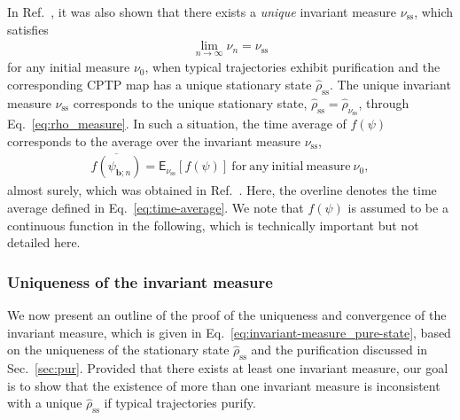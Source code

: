 \documentclass[preprint,pteplogo]{ptephy_v2}%
\numberwithin{equation}{section}
\theoremstyle{definition}
\begin{document}
In Ref.~\cite{benoist2019invariant}, it was also shown that there exists a \textit{unique} invariant measure $\nu_\mathrm{ss}$, which satisfies
\begin{align}
    \lim_{n\rightarrow\infty}\nu_n=\nu_\mathrm{ss}
    \label{eq:invariant-measure_pure-state}
\end{align}
for any initial measure $\nu_0$, when typical trajectories exhibit purification and the corresponding CPTP map has a unique stationary state $\hat{\rho}_\mathrm{ss}$. 
The unique invariant measure $\nu_\mathrm{ss}$ corresponds to the unique stationary state, $\hat{\rho}_\mathrm{ss}=\hat{\rho}_{\nu_\mathrm{ss}}$, through Eq.~\eqref{eq:rho_measure}.
In such a situation, the time average of $f(\psi)$ corresponds to the average over the invariant measure $\nu_\mathrm{ss}$,
\begin{align}
    \overline{f(\psi_{\bm{b};n})}=\mathsf{E}_{\nu_\mathrm{ss}}[f(\psi)]\ \mathrm{for\ any\ initial\ measure}\ \nu_0,
    \label{eq:average_nonlinear-quantity_any-measure}
\end{align}
almost surely, which was obtained in Ref.~\cite{benoist2023limit}. 
Here, the overline denotes the time average defined in Eq.~\eqref{eq:time-average}.
We note that $f(\psi)$ is assumed to be a continuous function in the following, which is technically important but not detailed here.  


\subsubsection{Uniqueness of the invariant measure}
We now present an outline of the proof of the uniqueness and convergence of the invariant measure, which is given in Eq.~\eqref{eq:invariant-measure_pure-state}, based on the uniqueness of the stationary state $\hat{\rho}_\mathrm{ss}$ and the purification discussed in Sec.~\ref{sec:pur}.
Provided that there exists at least one invariant measure, our goal is to show that the existence of more than one invariant measure is inconsistent with a unique $\hat{\rho}_\mathrm{ss}$ if typical trajectories purify. 
\end{document}
